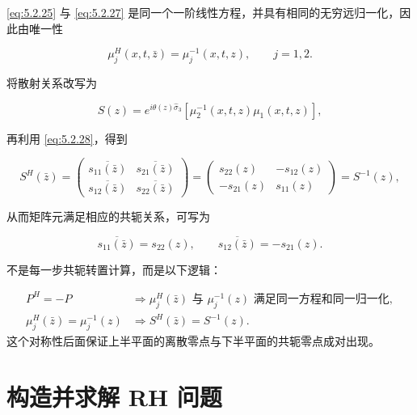 \documentclass[
    lang=cn,
    scheme=chinese,
    mode=simple,
    device=normal,
    color=blue,
    math=cm,
    thmcnt=section,
    12pt,
    nowatermark
]{elegantbook}
\begin{document}
\eqref{eq:5.2.25} 与 \eqref{eq:5.2.27} 是同一个一阶线性方程，并具有相同的无穷远归一化，因此由唯一性

\begin{equation}
    \mu_j^H(x,t,\bar z)
    =
    \mu_j^{-1}(x,t,z),
    \qquad j=1,2.
    \tag{5.2.28}
    \label{eq:5.2.28}
\end{equation}

将散射关系改写为

\begin{equation}
    S(z)
    =
    e^{i\theta(z)\widehat{\sigma}_3}
    \left[\mu_2^{-1}(x,t,z)\mu_1(x,t,z)\right],
    \tag{5.2.29}
    \label{eq:5.2.29}
\end{equation}

再利用 \eqref{eq:5.2.28}，得到

\[
    S^H(\bar z)
    =
    \begin{pmatrix}
        \overline{s_{11}(\bar z)} & \overline{s_{21}(\bar z)} \\
        \overline{s_{12}(\bar z)} & \overline{s_{22}(\bar z)}
    \end{pmatrix}
    =
    \begin{pmatrix}
        s_{22}(z)  & -s_{12}(z) \\
        -s_{21}(z) & s_{11}(z)
    \end{pmatrix}
    =
    S^{-1}(z),
\]

从而矩阵元满足相应的共轭关系，可写为

\begin{equation}
    \overline{s_{11}(\bar z)}=s_{22}(z),
    \qquad
    \overline{s_{12}(\bar z)}=-s_{21}(z).
    \tag{5.2.30}
    \label{eq:5.2.30}
\end{equation}

\begin{callout}[2.2 节真正要记住什么？]
    不是每一步共轭转置计算，而是以下逻辑：

    \[
        \begin{aligned}
            P^H=-P
             & \Longrightarrow
            \mu_j^H(\bar z)\text{ 与 }\mu_j^{-1}(z)
            \text{ 满足同一方程和同一归一化},
            \\
            \mu_j^H(\bar z)=\mu_j^{-1}(z)
             & \Longrightarrow
            S^H(\bar z)=S^{-1}(z).
        \end{aligned}
    \]
    这个对称性后面保证上半平面的离散零点与下半平面的共轭零点成对出现。
\end{callout}

\section{构造并求解 RH 问题}
\end{document}
